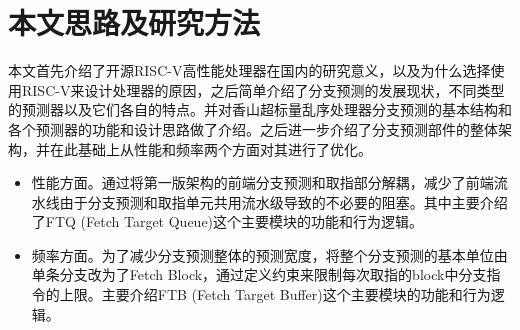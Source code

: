 



\section{本文思路及研究方法}

本文首先介绍了开源RISC-V高性能处理器在国内的研究意义，以及为什么选择使用RISC-V来设计处理器的原因，之后简单介绍了分支预测的发展现状，不同类型的预测器以及它们各自的特点。并对香山超标量乱序处理器分支预测的基本结构和各个预测器的功能和设计思路做了介绍。之后进一步介绍了分支预测部件的整体架构，并在此基础上从性能和频率两个方面对其进行了优化。

\begin{itemize}
	\item 性能方面。通过将第一版架构的前端分支预测和取指部分解耦，减少了前端流水线由于分支预测和取指单元共用流水级导致的不必要的阻塞。其中主要介绍了FTQ (Fetch Target Queue)这个主要模块的功能和行为逻辑。
	\item 频率方面。为了减少分支预测整体的预测宽度，将整个分支预测的基本单位由单条分支改为了Fetch Block，通过定义约束来限制每次取指的block中分支指令的上限。主要介绍FTB (Fetch Target Buffer)这个主要模块的功能和行为逻辑。
\end{itemize}

